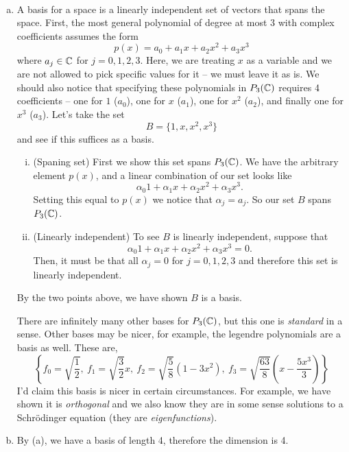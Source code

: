 \documentclass[12pt]{article} %
\begin{document}
\begin{solution}~
\begin{enumerate}[(a)]
    \item A basis for a space is a linearly independent set of vectors that spans the space. First, the most general polynomial of degree at most 3 with complex coefficients assumes the form
    \[
        p(x) = a_0 + a_1 x + a_2 x^2 + a_3 x^3
    \]
    where $a_j \in \mathbb{C}$ for $j=0,1,2,3$. Here, we are treating $x$ as a variable and we are not allowed to pick specific values for it -- we must leave it as is. We should also notice that specifying these polynomials in $P_3(\mathbb{C})$ requires 4 coefficients -- one for $1$ ($a_0$), one for $x$ ($a_1$), one for $x^2$ ($a_2$), and finally one for $x^3$ ($a_3$). Let's take the set
    \[
    B=\{1, x,x^2,x^3\}
    \]
    and see if this suffices as a basis.
    \begin{enumerate}[i.]
        \item (Spaning set) First we show this set spans $P_3(\mathbb{C})$. We have the arbitrary element $p(x)$, and a linear combination of our set looks like
        \[
        \alpha_0 1 + \alpha_1 x + \alpha_2 x^2 + \alpha_3 x^3.
        \]
        Setting this equal to $p(x)$ we notice that $\alpha_j = a_j$. So our set $B$ spans $P_3(\mathbb{C})$.
        \item (Linearly independent) To see $B$ is linearly independent, suppose that
        \[
        \alpha_0 1 + \alpha_1 x + \alpha_2 x^2 + \alpha_3 x^3 = 0.
        \]
        Then, it must be that all $\alpha_j=0$ for $j=0,1,2,3$ and therefore this set is linearly independent.
    \end{enumerate}
    By the two points above, we have shown $B$ is a basis.

    \begin{remark}
    There are infinitely many other bases for $P_3(\mathbb{C})$, but this one is \emph{standard} in a sense. Other bases may be nicer, for example, the legendre polynomials are a basis as well. These are,
    \[
     \left\{f_0 = \sqrt{\frac{1}{2}}, ~ f_1 = \sqrt{\frac{3}{2}}x, ~ f_2 = \sqrt{\frac{5}{8}} (1-3x^2),~ f_3=\sqrt{\frac{63}{8}}\left(x-\frac{5x^3}{3}\right) \right\}
    \]
    I'd claim this basis is nicer in certain circumstances. For example, we have shown it is \emph{orthogonal} and we also know they are in some sense solutions to a Schr\"odinger equation (they are \emph{eigenfunctions}).
    \end{remark}

    \item By (a), we have a basis of length 4, therefore the dimension is 4.


\end{enumerate}
\end{solution}
\end{document}
